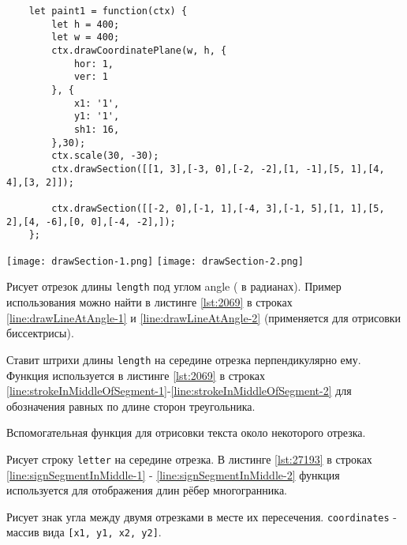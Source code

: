 \begin{lstlisting}
    let paint1 = function(ctx) {
        let h = 400;
        let w = 400;
        ctx.drawCoordinatePlane(w, h, {
            hor: 1,
            ver: 1
        }, {
            x1: '1',
            y1: '1',
            sh1: 16,
        },30);
        ctx.scale(30, -30);
        ctx.drawSection([[1, 3],[-3, 0],[-2, -2],[1, -1],[5, 1],[4, 4],[3, 2]]);

        ctx.drawSection([[-2, 0],[-1, 1],[-4, 3],[-1, 5],[1, 1],[5, 2],[4, -6],[0, 0],[-4, -2],]);
    };
    \end{lstlisting}
    \texttt{[image: drawSection-1.png]}
    \texttt{[image: drawSection-2.png]}

Рисует отрезок длины \texttt{length} под углом angle ( в радианах). Пример использования можно найти в листинге \ref{lst:2069} в строках \ref{line:drawLineAtAngle-1} и \ref{line:drawLineAtAngle-2} (применяется для отрисовки биссектрисы). 

Ставит штрихи длины \texttt{length} на середине отрезка перпендикулярно ему. Функция используется в листинге \ref{lst:2069} в строках \ref{line:strokeInMiddleOfSegment-1}-\ref{line:strokeInMiddleOfSegment-2} для обозначения равных по длине сторон треугольника.

Вспомогательная функция для отрисовки текста около некоторого отрезка.

Рисует строку \texttt{letter} на середине отрезка. В листинге \ref{lst:27193} в строках \ref{line:signSegmentInMiddle-1} - \ref{line:signSegmentInMiddle-2} функция используется для отображения длин рёбер многогранника.

Рисует знак угла между двумя отрезками в месте их пересечения. \texttt{coordinates} - массив вида \texttt{[x1, y1, x2, y2]}.

